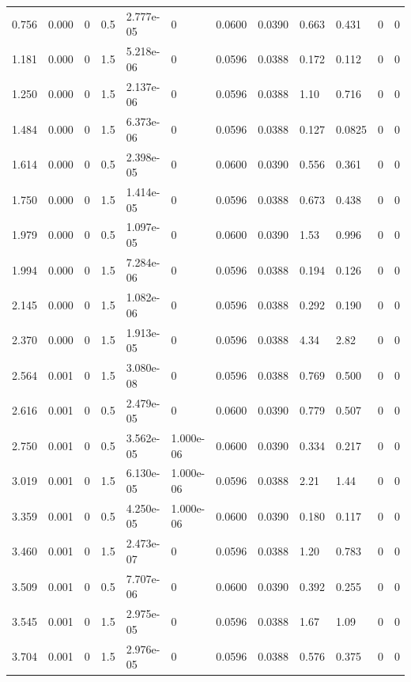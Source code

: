 \documentclass[preview]{standalone}
\begin{document}
{{\begin{tabular}{L{1.2cm}C{1.2cm} C{0.3cm}C{0.5cm} C{1.4cm}C{1.4cm} C{1.4cm}C{1.4cm} C{1.6cm}C{1.6cm} C{1.6cm}C{1.6cm}}
  0.756  &  0.000  & 0     & 0.5 &  2.777e-05  & 0  &  0.0600&   0.0390& 0.663 & 0.431   &  0 & 0  \\ 
  1.181  &  0.000  & 0     & 1.5 &  5.218e-06  & 0  &  0.0596&   0.0388& 0.172 & 0.112   &  0 & 0  \\ 
  1.250  &  0.000  & 0     & 1.5 &  2.137e-06  & 0  &  0.0596&   0.0388& 1.10 & 0.716   &  0 & 0  \\ 
  1.484  &  0.000  & 0     & 1.5 &  6.373e-06  & 0  &  0.0596&   0.0388& 0.127 & 0.0825   &  0 & 0  \\ 
  1.614  &  0.000  & 0     & 0.5 &  2.398e-05  & 0  &  0.0600&   0.0390& 0.556 & 0.361   &  0 & 0  \\ 
  1.750  &  0.000  & 0     & 1.5 &  1.414e-05  & 0  &  0.0596&   0.0388& 0.673 & 0.438   &  0 & 0  \\ 
  1.979  &  0.000  & 0     & 0.5 &  1.097e-05  & 0  &  0.0600&   0.0390& 1.53 & 0.996   &  0 & 0  \\ 
  1.994  &  0.000  & 0     & 1.5 &  7.284e-06  & 0  &  0.0596&   0.0388& 0.194 & 0.126   &  0 & 0  \\ 
  2.145  &  0.000  & 0     & 1.5 &  1.082e-06  & 0  &  0.0596&   0.0388& 0.292 & 0.190   &  0 & 0  \\ 
  2.370  &  0.000  & 0     & 1.5 &  1.913e-05  & 0  &  0.0596&   0.0388& 4.34 & 2.82   &  0 & 0  \\ 
  2.564  &  0.001  & 0     & 1.5 &  3.080e-08  & 0  &  0.0596&   0.0388& 0.769 & 0.500   &  0 & 0  \\ 
  2.616  &  0.001  & 0     & 0.5 &  2.479e-05  & 0  &  0.0600&   0.0390& 0.779 & 0.507   &  0 & 0  \\ 
  2.750  &  0.001  & 0     & 0.5 &  3.562e-05  & 1.000e-06  &  0.0600&   0.0390& 0.334 & 0.217   &  0 & 0  \\ 
  3.019  &  0.001  & 0     & 1.5 &  6.130e-05  & 1.000e-06  &  0.0596&   0.0388& 2.21 & 1.44   &  0 & 0  \\ 
  3.359  &  0.001  & 0     & 0.5 &  4.250e-05  & 1.000e-06  &  0.0600&   0.0390& 0.180 & 0.117   &  0 & 0  \\ 
  3.460  &  0.001  & 0     & 1.5 &  2.473e-07  & 0  &  0.0596&   0.0388& 1.20 & 0.783   &  0 & 0  \\ 
  3.509  &  0.001  & 0     & 0.5 &  7.707e-06  & 0  &  0.0600&   0.0390& 0.392 & 0.255   &  0 & 0  \\ 
  3.545  &  0.001  & 0     & 1.5 &  2.975e-05  & 0  &  0.0596&   0.0388& 1.67 & 1.09   &  0 & 0  \\ 
  3.704  &  0.001  & 0     & 1.5 &  2.976e-05  & 0  &  0.0596&   0.0388& 0.576 & 0.375   &  0 & 0  \\ 

\end{tabular}}}
\end{document}
